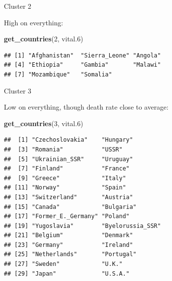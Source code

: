 \documentclass[ignorenonframetext,]{beamer}
\newenvironment{Shaded}{\begin{snugshade}}{\end{snugshade}}
\newcommand{\DecValTok}[1]{\textcolor[rgb]{0.00,0.00,0.81}{#1}}
\newcommand{\FloatTok}[1]{\textcolor[rgb]{0.00,0.00,0.81}{#1}}
\newcommand{\KeywordTok}[1]{\textcolor[rgb]{0.13,0.29,0.53}{\textbf{#1}}}
\newcommand{\NormalTok}[1]{#1}
\begin{document}
\begin{frame}[fragile]{Cluster 2}
\protect\hypertarget{cluster-2}{}

High on everything:

\normalsize

\begin{Shaded}
\begin{Highlighting}[]
\KeywordTok{get_countries}\NormalTok{(}\DecValTok{2}\NormalTok{, vital}\FloatTok{.6}\NormalTok{)}
\end{Highlighting}
\end{Shaded}

\begin{verbatim}
## [1] "Afghanistan"  "Sierra_Leone" "Angola"      
## [4] "Ethiopia"     "Gambia"       "Malawi"      
## [7] "Mozambique"   "Somalia"
\end{verbatim}

\normalsize

\end{frame}

\begin{frame}[fragile]{Cluster 3}
\protect\hypertarget{cluster-3-1}{}

Low on everything, though death rate close to average: \footnotesize

\begin{Shaded}
\begin{Highlighting}[]
\KeywordTok{get_countries}\NormalTok{(}\DecValTok{3}\NormalTok{, vital}\FloatTok{.6}\NormalTok{)}
\end{Highlighting}
\end{Shaded}

\begin{verbatim}
##  [1] "Czechoslovakia"    "Hungary"          
##  [3] "Romania"           "USSR"             
##  [5] "Ukrainian_SSR"     "Uruguay"          
##  [7] "Finland"           "France"           
##  [9] "Greece"            "Italy"            
## [11] "Norway"            "Spain"            
## [13] "Switzerland"       "Austria"          
## [15] "Canada"            "Bulgaria"         
## [17] "Former_E._Germany" "Poland"           
## [19] "Yugoslavia"        "Byelorussia_SSR"  
## [21] "Belgium"           "Denmark"          
## [23] "Germany"           "Ireland"          
## [25] "Netherlands"       "Portugal"         
## [27] "Sweden"            "U.K."             
## [29] "Japan"             "U.S.A."
\end{verbatim}

\normalsize

\end{frame}
\end{document}
